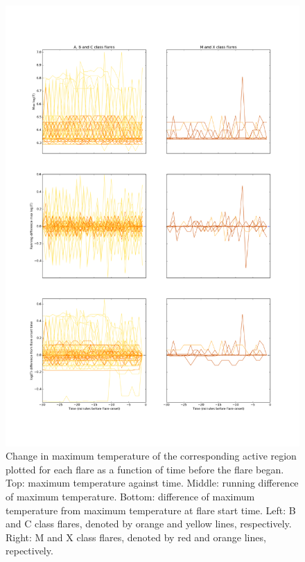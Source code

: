 \documentclass[referee,a4paper,12pt]{swsc}
\begin{document}
\begin{linenumbers}
\begin{figure}
	\centering
		\includegraphics[width=0.7\columnwidth]{tempplotsmax/allars.png}
	\caption{Change in maximum temperature of the corresponding active region plotted for each flare as a function of time before the flare began. Top: maximum temperature against time. Middle: running difference of maximum temperature. Bottom: difference of maximum temperature from maximum temperature at flare start time. Left: B and C class flares, denoted by orange and yellow lines, respectively. Right: M and X class flares, denoted by red and orange lines, repectively.}
	\label{fig:allars_max}
\end{figure}
\begin{figure}
	\centering

\end{figure}
\end{linenumbers}
\end{document}
